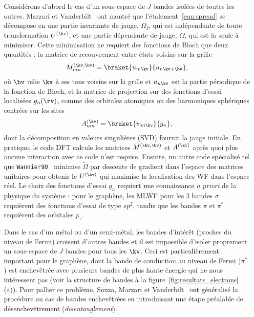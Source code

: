 Considérons d'abord le cas d'un sous-espace de $J$ bandes isolées de toutes les autres. Marzari et Vanderbilt~\cite{marzariMaximallyLocalizedGeneralized1997} ont montré que l'étalement~\eqref{eqn:spread} se décompose en une partie invariante de jauge, $\Omega_I$, qui est indépendante de toute transformation $U^{(\kv)}$, et une partie dépendante de jauge, $\widetilde{\Omega}$, qui est la seule à minimiser. Cette minimisation ne requiert des fonctions de Bloch que deux quantités : la matrice de recouvrement entre états voisins sur la grille
\begin{equation}
    M^{(\kv,\bv)}_{mn}=\braket{u_{m\kv}}{u_{n\kv+\bv}},
\end{equation}
où $\bv$ relie $\kv$ à ses tous voisins sur la grille et $u_{n\kv}$ est la partie périodique de la fonction de Bloch, et la matrice de projection sur des fonctions d'essai localisées $g_n(\rv)$, comme des orbitales atomiques ou des harmoniques sphériques centrées sur les sites
\begin{equation}
    A^{(\kv)}_{mn}=\braket{\psi_{m\kv}}{g_n},
\end{equation}
dont la décomposition en valeurs singulières (SVD) fournit la jauge initiale. En pratique, le code DFT calcule les matrices $M^{(\kv,\bv)}$ et $A^{(\kv)}$ après quoi plus aucune interaction avec ce code n'est requise. Ensuite, un autre code spécialisé tel que \texttt{Wannier90}~\cite{mostofiWannier90ToolObtaining2008,mostofiUpdatedVersionWannier902014,pizziWannier90CommunityCode2020} minimise $\widetilde{\Omega}$ par descente de gradient dans l'espace des matrices unitaires pour obtenir le $U^{(\kv)}$ qui maximise la localisation des WF dans l'espace réel. Le choix des fonctions d'essai $g_n$ requiert une connaissance \textit{a priori} de la physique du système : pour le graphène, les MLWF pour les 3 bandes $\sigma$ requièrent des fonctions d'essai de type $sp^2$, tandis que les bandes $\pi$ et $\pi^*$ requièrent des orbitales $p_z$.


Dans le cas d'un métal ou d'un semi-métal, les bandes d'intérêt (proches du niveau de Fermi) croisent d'autres bandes et il est impossible d'isoler proprement un sous-espace de $J$ bandes pour tous les $\kv$. Ceci est particulièrement important pour le graphène, dont la bande de conduction au niveau de Fermi ($\pi^*$) est enchevêtrée avec plusieurs bandes de plus haute énergie qui ne nous intéressent pas (voir la structure de bandes à la figure~\ref{fig:resultats_electrons} (a)). Pour pallier ce problème, Souza, Marzari et Vanderbilt~\cite{souzaMaximallylocalizedWannierFunctions2001} ont généralisé la procédure au cas de bandes enchevêtrées en introduisant une étape préalable de désenchevêtrement (\textit{disentanglement}).

